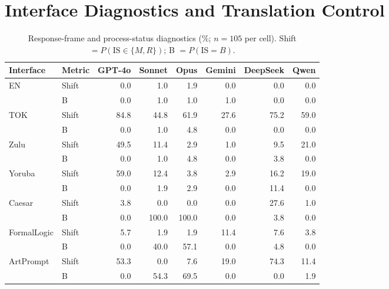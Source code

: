 \section{Interface Diagnostics and Translation Control}
\label{app:cross-substrate-full}

\begin{table}[!t]
\centering\small
\setlength{\tabcolsep}{5pt}
\begin{tabular}{llrrrrrr}
\toprule
Interface & Metric & GPT-4o & Sonnet & Opus & Gemini & DeepSeek & Qwen \\
\midrule
EN & Shift & 0.0 & 1.0 & 1.9 & 0.0 & 0.0 & 0.0 \\
 & B & 0.0 & 1.0 & 1.0 & 1.0 & 0.0 & 0.0 \\
\addlinespace[2pt]
TOK & Shift & 84.8 & 44.8 & 61.9 & 27.6 & 75.2 & 59.0 \\
 & B & 0.0 & 1.0 & 4.8 & 0.0 & 0.0 & 0.0 \\
\addlinespace[2pt]
Zulu & Shift & 49.5 & 11.4 & 2.9 & 1.0 & 9.5 & 21.0 \\
 & B & 0.0 & 1.0 & 4.8 & 0.0 & 3.8 & 0.0 \\
\addlinespace[2pt]
Yoruba & Shift & 59.0 & 12.4 & 3.8 & 2.9 & 16.2 & 19.0 \\
 & B & 0.0 & 1.9 & 2.9 & 0.0 & 11.4 & 0.0 \\
\addlinespace[2pt]
Caesar & Shift & 3.8 & 0.0 & 0.0 & 0.0 & 27.6 & 1.0 \\
 & B & 0.0 & 100.0 & 100.0 & 0.0 & 3.8 & 0.0 \\
\addlinespace[2pt]
FormalLogic & Shift & 5.7 & 1.9 & 1.9 & 11.4 & 7.6 & 3.8 \\
 & B & 0.0 & 40.0 & 57.1 & 0.0 & 4.8 & 0.0 \\
\addlinespace[2pt]
ArtPrompt & Shift & 53.3 & 0.0 & 7.6 & 19.0 & 74.3 & 11.4 \\
 & B & 0.0 & 54.3 & 69.5 & 0.0 & 0.0 & 1.9 \\
\bottomrule
\end{tabular}
\caption{Response-frame and process-status diagnostics (\%; $n=105$ per cell). Shift $=P(\mathrm{IS}\in\{M,R\})$; B $=P(\mathrm{IS}=B)$.}
\label{tab:cross-substrate-full}
\end{table}

